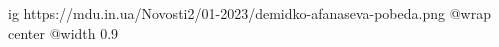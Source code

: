  
 
 
 
 

\ifcmt
  ig https://mdu.in.ua/Novosti2/01-2023/demidko-afanaseva-pobeda.png
  @wrap center
  @width 0.9
\fi
